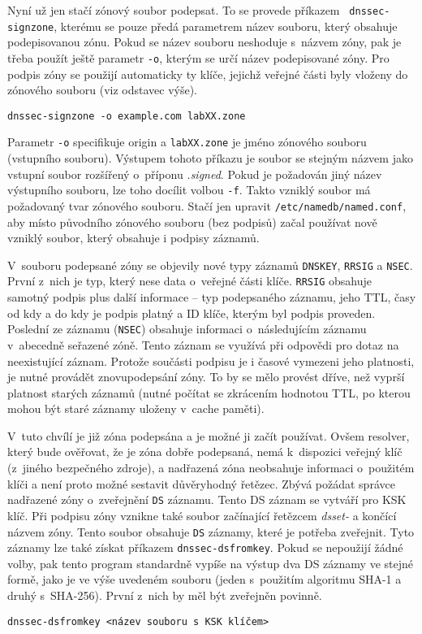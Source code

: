 Nyní už jen stačí zónový soubor podepsat. To se provede příkazem {\tt
dnssec-signzone}, kterému se pouze předá parametrem název souboru, který obsahuje podepisovanou zónu. Pokud se název souboru neshoduje s~názvem zóny, pak je třeba použít ještě parametr {\tt -o}, kterým se určí název podepisované zóny. Pro podpis zóny se použijí automaticky ty klíče, jejichž veřejné části byly vloženy do zónového souboru (viz odstavec výše).
\begin{verbatim}
dnssec-signzone -o example.com labXX.zone
\end{verbatim}
Parametr \verb|-o| specifikuje origin a \verb|labXX.zone| je jméno zónového
souboru (vstupního souboru).
Výstupem tohoto příkazu je soubor se stejným názvem jako vstupní soubor rozšířený o~příponu {\em .signed}. Pokud je požadován jiný název výstupního souboru, lze toho docílit volbou {\tt -f}. Takto vzniklý soubor má požadovaný tvar zónového souboru. Stačí jen upravit {\tt /etc/namedb/named.conf}, aby místo původního zónového souboru (bez podpisů) začal používat nově vzniklý soubor, který obsahuje i podpisy záznamů.

V~souboru podepsané zóny se objevily nové typy záznamů {\tt DNSKEY}, {\tt RRSIG} a {\tt NSEC}. První z~nich je typ, který nese data o~veřejné části klíče. {\tt RRSIG} obsahuje samotný podpis plus další informace -- typ podepsaného záznamu, jeho TTL, časy od kdy a do kdy je podpis platný a ID klíče, kterým byl podpis proveden. Poslední ze záznamu ({\tt NSEC}) obsahuje informaci o~následujícím záznamu v~abecedně seřazené zóně. Tento záznam se využívá při odpovědi pro dotaz na neexistující záznam. Protože součásti podpisu je i časové vymezeni jeho platnosti, je nutné provádět znovupodepsání zóny. To by se mělo provést dříve, než vyprší platnost starých záznamů (nutné počítat se zkrácením hodnotou TTL, po kterou mohou být staré záznamy uloženy v~cache paměti).

V~tuto chvílí je již zóna podepsána a je možné ji začít používat. Ovšem resolver, který bude ověřovat, že je zóna dobře podepsaná, nemá k~dispozici veřejný klíč (z~jiného bezpečného zdroje), a nadřazená zóna neobsahuje informaci o~použitém klíči a není proto možné sestavit důvěryhodný řetězec. Zbývá požádat správce nadřazené zóny o~zveřejnění {\tt DS} záznamu. Tento DS záznam se vytváří pro KSK klíč. Při podpisu zóny vznikne také soubor začínající řetězcem {\em dsset-} a končící názvem zóny. Tento soubor obsahuje {\tt DS} záznamy, které je potřeba zveřejnit. Tyto záznamy lze také získat příkazem {\tt dnssec-dsfromkey}. Pokud se nepoužijí žádné volby, pak tento program standardně vypíše na výstup dva DS záznamy ve stejné formě, jako je ve výše uvedeném souboru (jeden s~použitím algoritmu SHA-1 a druhý s~SHA-256). První z~nich by měl být zveřejněn povinně.
\begin{verbatim}
dnssec-dsfromkey <název souboru s KSK klíčem>
\end{verbatim}

